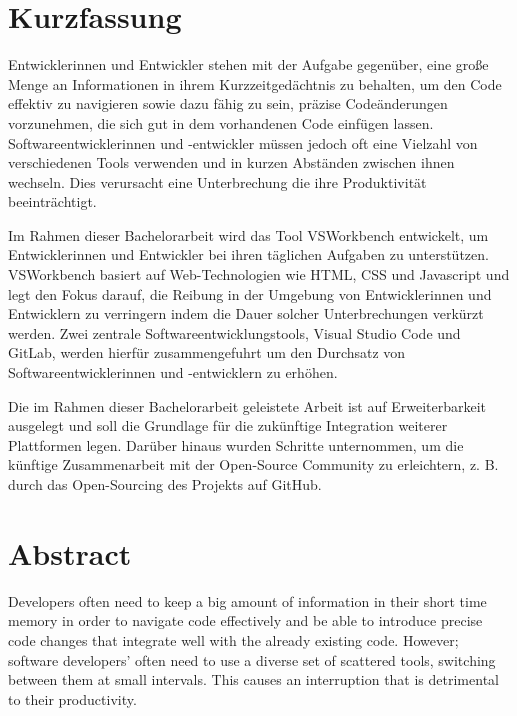 \section*{Kurzfassung}

Entwicklerinnen und Entwickler stehen mit der Aufgabe gegenüber, eine große Menge an Informationen in ihrem Kurzzeitgedächtnis zu behalten, 
um den Code effektiv zu navigieren sowie dazu fähig zu sein, präzise Codeänderungen vorzunehmen, die sich gut in dem vorhandenen Code einfügen lassen.
Softwareentwicklerinnen und -entwickler müssen jedoch oft eine Vielzahl von verschiedenen Tools verwenden und in kurzen Abständen zwischen ihnen wechseln. Dies verursacht eine Unterbrechung 
die ihre Produktivität beeinträchtigt. 



Im Rahmen dieser Bachelorarbeit wird das Tool VSWorkbench entwickelt, um Entwicklerinnen und Entwickler bei ihren täglichen Aufgaben zu unterstützen.
VSWorkbench basiert auf Web-Technologien wie HTML, CSS und Javascript und legt den Fokus darauf, die Reibung in der Umgebung von Entwicklerinnen und Entwicklern zu verringern 
indem die Dauer solcher Unterbrechungen verkürzt werden. Zwei zentrale Softwareentwicklungstools, Visual Studio Code und GitLab, werden hierfür zusammengefuhrt 
 um den Durchsatz von Softwareentwicklerinnen und -entwicklern zu erhöhen. 

Die im Rahmen dieser Bachelorarbeit geleistete Arbeit ist auf Erweiterbarkeit ausgelegt und soll die Grundlage für die zukünftige Integration weiterer Plattformen legen.
Darüber hinaus wurden Schritte unternommen, um die künftige Zusammenarbeit mit der Open-Source Community zu erleichtern, z. B. durch das Open-Sourcing des Projekts auf GitHub.

\begingroup
	
	\section*{Abstract}
    Developers often need to keep a big amount of information in their short time memory in order to navigate code effectively and be able to introduce precise code
    changes that integrate well with the already existing code.
    However; software developers' often need to use a diverse set of scattered tools, switching between them at small intervals. This causes an interruption 
    that is detrimental to their productivity. 

